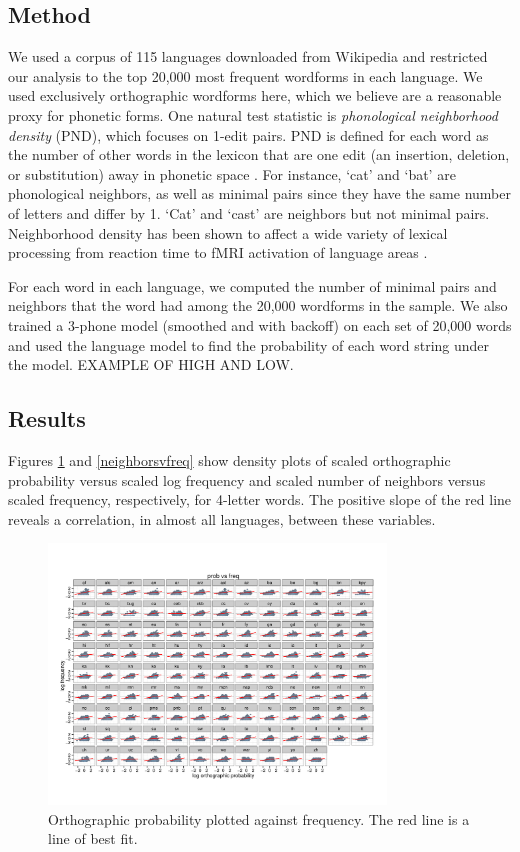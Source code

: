 \documentclass{article}
\begin{document}
\subsection{Method} We used a corpus of 115 languages downloaded from Wikipedia and restricted our analysis to
the top 20,000 most frequent wordforms in each language. We used exclusively orthographic wordforms here,
which we believe are a reasonable proxy for phonetic forms. One natural test statistic is \emph{phonological neighborhood density} (PND),
which focuses on 1-edit pairs. PND is defined for each word as the number of other words in the lexicon that
are one edit (an insertion, deletion, or substitution) away in phonetic space
\citep{luce1986neighborhoods,luce1998recognizing}. For instance, `cat' and `bat' are phonological neighbors,
as well as minimal pairs since they have the same number of letters and differ by 1. `Cat' and `cast' are
neighbors but not minimal pairs.
Neighborhood density has been shown to affect a wide variety of lexical processing from reaction time
\citep{vitevitch1998words} to fMRI activation of language areas \citep{prabhakaran2006event}.

For each word in each language, we computed the
number of minimal pairs and neighbors that the word had among the 20,000 wordforms in the sample. We also
trained a 3-phone model (smoothed and with backoff) on each set of 20,000 words and used the language model to
find the probability of each word string under the model. EXAMPLE OF HIGH AND LOW.

\subsection{Results} 


Figures \ref{probvfreq} and \ref{neighborsvfreq} show density plots of scaled orthographic probability versus
scaled log frequency and scaled number of neighbors versus scaled frequency, respectively, for 4-letter words.
The positive slope of the red line reveals a correlation, in almost all languages, between these variables.


\begin{figure}[htbp]
  \centering
  \includegraphics[width=0.8\textwidth]{PDFs/big_cor2_probvfreq.pdf}
  \caption{Orthographic probability plotted against frequency. The red line is a line of best fit.}
  \label{probvfreq}
\end{figure}
\end{document}
